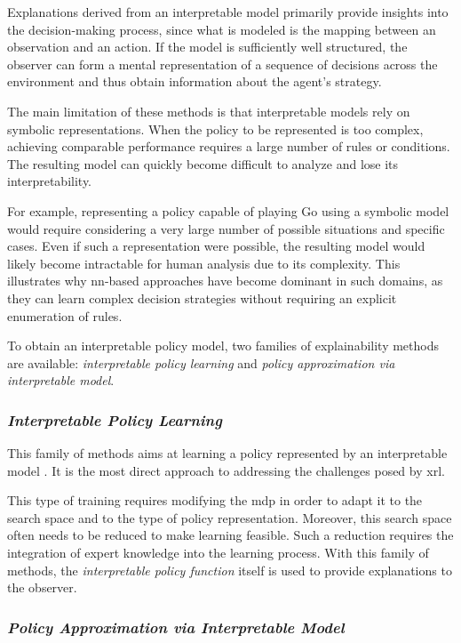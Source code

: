 Explanations derived from an interpretable model primarily provide insights into the decision-making process, since what is modeled is the mapping between an observation and an action.
If the model is sufficiently well structured, the observer can form a mental representation of a sequence of decisions across the environment and thus obtain information about the agent's strategy.

The main limitation of these methods is that interpretable models rely on symbolic representations.
When the policy to be represented is too complex, achieving comparable performance requires a large number of rules or conditions.
The resulting model can quickly become difficult to analyze and lose its interpretability.

For example, representing a policy capable of playing Go using a symbolic model would require considering a very large number of possible situations and specific cases.
Even if such a representation were possible, the resulting model would likely become intractable for human analysis due to its complexity.
This illustrates why \gls{nn}-based approaches have become dominant in such domains, as they can learn complex decision strategies without requiring an explicit enumeration of rules.

To obtain an interpretable policy model, two families of explainability methods are available: \textit{interpretable policy learning} and \textit{policy approximation via interpretable model}.

\subsubsection{\textit{Interpretable Policy Learning}}
\label{subsubsec:interpretable_policy_learning}

This family of methods aims at learning a policy represented by an interpretable model \parencite{topin2021iterative, trivedi2022learning}.
It is the most direct approach to addressing the challenges posed by \gls{xrl}.

This type of training requires modifying the \gls{mdp} in order to adapt it to the search space and to the type of policy representation.
Moreover, this search space often needs to be reduced to make learning feasible.
Such a reduction requires the integration of expert knowledge into the learning process.
With this family of methods, the \textit{interpretable policy function} itself is used to provide explanations to the observer.

\subsubsection{\textit{Policy Approximation via Interpretable Model}}
\label{subsubsec:policy_approximation_via_interpretable_model}

